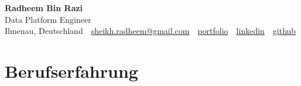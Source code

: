 \documentclass[10pt,a4paper]{resume}
\makeatletter
\newcommand{\Portfolio}{https://radheem.github.io/my-cv}
\newcommand{\PortfolioText}{portfolio}
\newcommand{\GitHub}{https://github.com/radheem}
\newcommand{\LinkedIn}{https://www.linkedin.com/in/radheem-razi}
\newcommand{\Email}{sheikh.radheem@gmail.com}
\makeatother
\begin{document}
\clearpage
{}

\begin{center}
  {\huge\bfseries Radheem Bin Razi}\\[3pt]
  {\large Data Platform Engineer}\\[6pt]
  \small
  Ilmenau, Deutschland \,\textbar\,
  \href{mailto:\Email}{\Email} \,\textbar\,
  \href{\Portfolio}{\PortfolioText} \,\textbar\,
  \href{\LinkedIn}{linkedin} \,\textbar\,
  \href{\GitHub}{github}
\end{center}
\vspace{2pt}

\section{Berufserfahrung}
\end{document}
